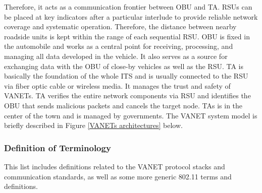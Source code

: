 \documentclass[
  oneside,
  11pt, a4paper,
  footinclude=true,
  headinclude=true,
  cleardoublepage=empty
]{scrbook}
\begin{document}
Therefore, it acts as a communication frontier between OBU and TA. RSUs can be placed at key indicators after a particular interlude to provide reliable network coverage and systematic operation. Therefore, the distance between nearby roadside units is kept within the range of each sequential RSU. OBU is fixed in the automobile and works as a central point for receiving, processing, and managing all data developed in the vehicle. It also serves as a source for exchanging data with the OBU of close-by vehicles as well as the RSU. TA is basically the foundation of the whole ITS and is usually connected to the RSU via fiber optic cable or wireless media. It manages the trust and safety of VANETs. TA verifies the entire network components via RSU and identifies the OBU that sends malicious packets and cancels the target node. TAs is in the center of the town and is managed by governments. The VANET system model is briefly described in Figure \ref{VANETs architectures} below.


\subsubsection{Definition of Terminology}
This list includes definitions related to the VANET protocol stacks and communication standards,  as well as some more generic 802.11 terms and definitions.
\end{document}
